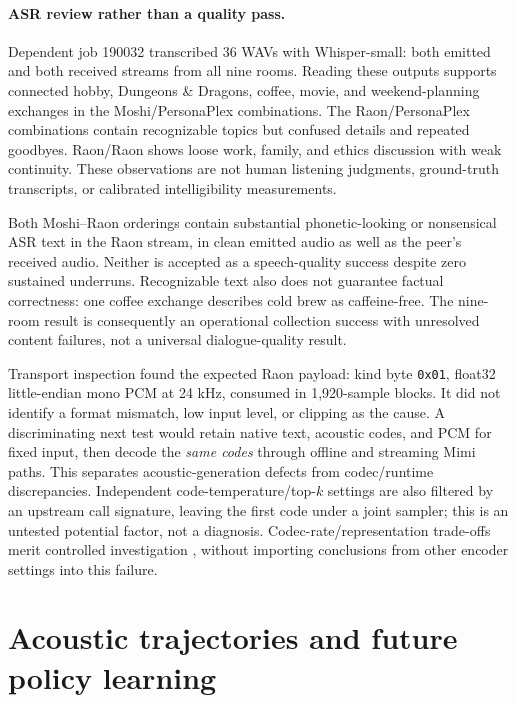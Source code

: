 \documentclass{article}
\newcommand{\code}[1]{\texttt{#1}}
\begin{document}
\paragraph{ASR review rather than a quality pass.} Dependent job 190032 transcribed 36 WAVs with Whisper-small: both emitted and both received streams from all nine rooms. Reading these outputs supports connected hobby, Dungeons \& Dragons, coffee, movie, and weekend-planning exchanges in the Moshi/PersonaPlex combinations. The Raon/PersonaPlex combinations contain recognizable topics but confused details and repeated goodbyes. Raon/Raon shows loose work, family, and ethics discussion with weak continuity. These observations are not human listening judgments, ground-truth transcripts, or calibrated intelligibility measurements.

Both Moshi--Raon orderings contain substantial phonetic-looking or nonsensical ASR text in the Raon stream, in clean emitted audio as well as the peer's received audio. Neither is accepted as a speech-quality success despite zero sustained underruns. Recognizable text also does not guarantee factual correctness: one coffee exchange describes cold brew as caffeine-free. The nine-room result is consequently an operational collection success with unresolved content failures, not a universal dialogue-quality result.

Transport inspection found the expected Raon payload: kind byte \code{0x01}, float32 little-endian mono PCM at 24 kHz, consumed in 1,920-sample blocks. It did not identify a format mismatch, low input level, or clipping as the cause. A discriminating next test would retain native text, acoustic codes, and PCM for fixed input, then decode the \emph{same codes} through offline and streaming Mimi paths. This separates acoustic-generation defects from codec/runtime discrepancies. Independent code-temperature/top-$k$ settings are also filtered by an upstream call signature, leaving the first code under a joint sampler; this is an untested potential factor, not a diagnosis. Codec-rate/representation trade-offs merit controlled investigation \citep{jung2026latent}, without importing conclusions from other encoder settings into this failure.

\section{Acoustic trajectories and future policy learning}
\label{sec:rl}
\end{document}
